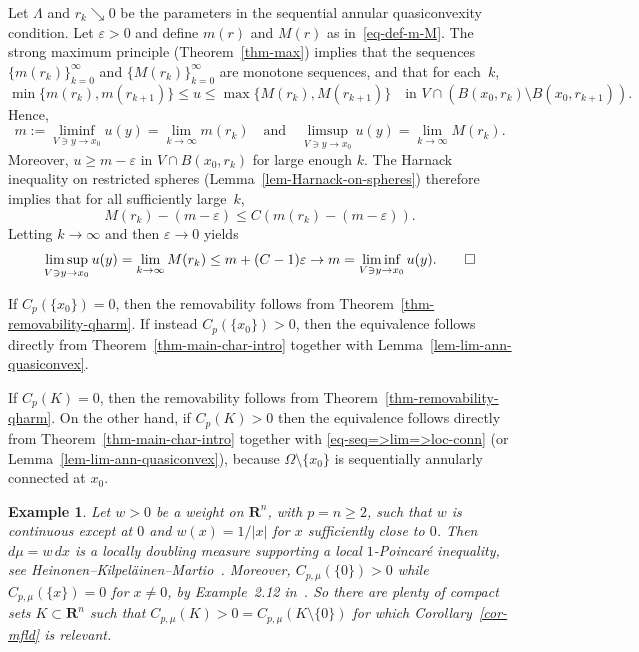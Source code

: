 \documentclass[a4paper,twoside]{article}
\makeatletter
\theoremstyle{propositional}
\theoremstyle{descriptive}
\newtheorem{example}[thm]{Example}
\theoremstyle{remarkstyle}
\renewenvironment{proof}[1][\proofname]{\par
  \pushQED{\qed}%
  \normalfont
  \trivlist
  \item[\hskip\labelsep
        \itshape
    #1\@addpunct{.}]\ignorespaces
}{%
  \popQED\endtrivlist\@endpefalse
}
\newcommand{\setm}{\setminus}
\newcommand{\Cp}{{C_p}}
\newcommand{\Cpmu}{{C_{p,\mu}}}
\newcommand{\Om}{\Omega}
\newcommand{\eps}{\varepsilon}
\newcommand{\La}{\Lambda}
\newcommand{\R}{\mathbf{R}}
\newcommand{\Rn}{\mathbf{R}^n}
\numberwithin{equation}{section}
\makeatother
\begin{document}
\begin{proof}[Proof of Lemma~\ref{lem-lim-ann-quasiconvex}]
Let $\La$ and $r_k \searrow 0$ 
be the parameters in the sequential annular quasiconvexity condition.
Let $\eps>0$ and define
$m(r)$ and $M(r)$ as in~\eqref{eq-def-m-M}.
The strong maximum principle (Theorem~\ref{thm-max}) implies that 
the sequences $\{m(r_k)\}_{k=0}^\infty$ and $\{M(r_k)\}_{k=0}^\infty$
are monotone sequences, and that for each~$k$,
\[
\min\{m(r_k),m(r_{k+1})\} \le u \le \max\{M(r_k),M(r_{k+1})\}
\quad \text{in } V \cap (B(x_0,r_{k}) \setm B(x_0, r_{k+1})).
\]
Hence,
\[
m:= \liminf_{V \ni  y\to x_0} u(y) =\lim_{k \to \infty} m(r_k)
\quad \text{and} \quad
\limsup_{V \ni  y\to x_0} u(y) =\lim_{k \to \infty} M(r_k).
\]
Moreover,     $u\ge m-\eps$ in $V\cap B(x_0,r_k)$ 
for large enough $k$.
The Harnack inequality on restricted spheres (Lemma~\ref{lem-Harnack-on-spheres})
therefore implies that for all sufficiently large~$k$,
\[
M(r_k) - (m-\eps) \le C (m(r_k) -(m-\eps)).
\]
Letting $k\to \infty$ and then $\eps\to0$ yields
\[
\limsup_{V \ni  y\to x_0} u(y)=
\lim_{k\to\infty} M(r_k) 
\le  m + (C-1)\eps \to m
=\liminf_{V \ni  y\to x_0} u(y).
\qedhere
\]
\end{proof}



\begin{proof}[Proof of Corollary~\ref{cor-X-one-pt}]
If $\Cp(\{x_0\})=0$, then 
the removability follows from Theorem~\ref{thm-removability-qharm}.
If instead $\Cp(\{x_0\})>0$,
then the equivalence follows directly from 
Theorem~\ref{thm-main-char-intro} together with Lemma~\ref{lem-lim-ann-quasiconvex}.
\end{proof}

\begin{proof}[Proof of Corollary~\ref{cor-mfld}]
If $\Cp(K)=0$, then 
the removability follows from Theorem~\ref{thm-removability-qharm}.
On  the other hand, if $\Cp(K)>0$ then the equivalence
follows directly from  Theorem~\ref{thm-main-char-intro}
together with \eqref{eq-seq=>lim=>loc-conn}
(or Lemma~\ref{lem-lim-ann-quasiconvex}),
because $\Om \setm \{x_0\}$ is 
sequentially annularly connected at $x_0$.
\end{proof}


\begin{example} \label{ex-Rn-1/x-loc}
Let $w>0$ be a weight on $\R^n$, with $p=n\ge2$, such that
$w$ is continuous except at $0$ and 
$w(x)=1/|x|$ for $x$ sufficiently close to $0$.
Then $d\mu=w\,dx$ is a locally doubling measure
supporting a local $1$-Poincar\'e inequality, see
Hei\-no\-nen--Kil\-pe\-l\"ai\-nen--Martio~\cite[Section~1.6]{HeKiMa}.
Moreover, $\Cpmu(\{0\})>0$ while $\Cpmu(\{x\})=0$ for $x \ne 0$,
by Example~2.12 in~\cite{HeKiMa}. 
So there are plenty of compact sets $K \subset \Rn$
such that $\Cpmu(K)>0=\Cpmu(K \setm \{0\})$
for which Corollary~\ref{cor-mfld} is relevant.
\end{example}
\end{document}
